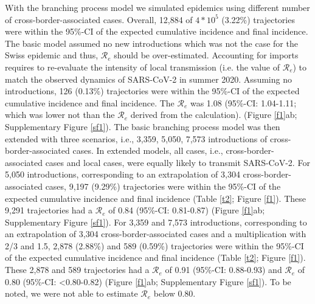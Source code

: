 \documentclass[10pt, a4paper, twoside]{article}
\begin{document}
\begin{multicols}{2}
With the branching process model we simulated epidemics using different number of cross-border-associated cases.
Overall, 12,884 of $4*10^5$ (3.22\%) trajectories were within the 95\%-CI of the expected cumulative incidence and final incidence.
The basic model assumed no new introductions which was not the case for the Swiss epidemic and thus, $\mathcal{R}_e$ should be over-estimated.
Accounting for imports requires to re-evaluate the intensity of local transmission (i.e. the value of $\mathcal{R}_e$) to match the observed dynamics of SARS-CoV-2 in summer 2020.
Assuming no introductions, 126 (0.13\%) trajectories were within the 95\%-CI of the expected cumulative incidence and final incidence.
The $\mathcal{R}_e$ was 1.08 (95\%-CI: 1.04-1.11; which was lower not than the $\mathcal{R}_e$ derived from the calculation). (Figure \ref{f1}ab; Supplementary Figure \ref{sf1}).
The basic branching process model was then extended with three scenarios, i.e., 3,359, 5,050, 7,573 introductions of cross-border-associated cases.
In extended models, all cases, i.e., cross-border-associated cases and local cases, were equally likely to transmit SARS-CoV-2.
For 5,050 introductions, corresponding to an extrapolation of 3,304 cross-border-associated cases, 9,197 (9.29\%) trajectories were within the 95\%-CI of the expected cumulative incidence and final incidence (Table \ref{t2}; Figure \ref{f1}).
These 9,291 trajectories had a $\mathcal{R}_e$ of 0.84 (95\%-CI: 0.81-0.87) (Figure \ref{f1}ab; Supplementary Figure \ref{sf1}).
For 3,359 and 7,573 introductions, corresponding to an extrapolation of 3,304 cross-border-associated cases and a multiplication with 2/3 and 1.5, 2,878 (2.88\%) and 589 (0.59\%) trajectories were within the 95\%-CI of the expected cumulative incidence and final incidence (Table \ref{t2}; Figure \ref{f1}).
These 2,878 and 589 trajectories had a $\mathcal{R}_e$ of 0.91 (95\%-CI: 0.88-0.93) and $\mathcal{R}_e$ of 0.80 (95\%-CI: <0.80-0.82) (Figure \ref{f1}ab; Supplementary Figure \ref{sf1}).
To be noted, we were not able to estimate $\mathcal{R}_e$ below 0.80.



\end{multicols}
\end{document}
